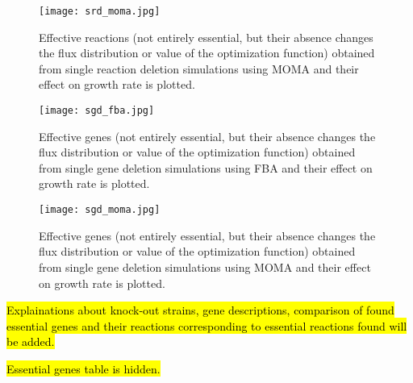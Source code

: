 \begin{figure}[H]
\begin{center}
\texttt{[image: srd\_moma.jpg]}
\end{center}
\caption[Effective reactions found from the deletion analysis using MOMA]{Effective reactions (not entirely essential, but  their absence changes the flux distribution or value of the optimization function) obtained from single reaction deletion simulations using MOMA and their effect on growth rate is plotted.}
\label{fig:srd_moma}
\end{figure}


\begin{figure}[H]
\begin{center}
\texttt{[image: sgd\_fba.jpg]}
\end{center}
\caption[Effective genes found from the deletion analysis using FBA]{Effective genes (not entirely essential, but  their absence changes the flux distribution or value of the optimization function) obtained from single gene deletion simulations using FBA and their effect on growth rate is plotted.}
\label{fig:sgd_fba}
\end{figure}

\begin{figure}[H]
\begin{center}
\texttt{[image: sgd\_moma.jpg]}
\end{center}
\caption[Effective genes found from the deletion analysis using MOMA]{Effective genes (not entirely essential, but their absence changes the flux distribution or value of the optimization function) obtained from single gene deletion simulations using MOMA and their effect on growth rate is plotted.}
\label{fig:sgd_moma}
\end{figure}
\hl{Explainations about knock-out strains, gene descriptions, comparison of found essential genes and their reactions corresponding to essential reactions found will be added.}

\hl{Essential genes table is hidden.}
% 
